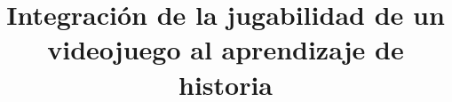 \documentclass{article}
\begin{document}
\title{Integración de la jugabilidad de un videojuego al aprendizaje de historia}

\maketitle






\end{document}
